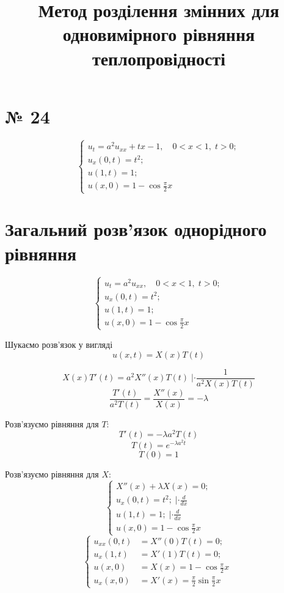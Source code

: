 \documentclass[11pt, a4paper]{article} %
\begin{document}

\title{Метод розділення змінних для одновимірного рівняння теплопровідності}
\date{}
\maketitle


\section*{№ 24}

\begin{mdframed}
    \begin{equation}
        \begin{cases}
            u_t=a^2 u_{xx} + tx -1, \quad 0<x<1,\; t>0;\\
            u_x(0,t) = t^2;\\
            u(1,t) = 1;\\
            u(x,0) = 1 - \cos \frac{\pi}{2}x
        \end{cases}    
    \end{equation}
\end{mdframed}

\section*{Загальний розв'язок однорідного рівняння}
\begin{mdframed}
    $$\begin{cases}
        u_t=a^2 u_{xx}, \quad 0<x<1,\; t>0;\\
        u_x(0,t) = t^2;\\
        u(1,t) = 1;\\
        u(x,0) = 1 - \cos \frac{\pi}{2}x
    \end{cases}$$
\end{mdframed}

Шукаємо розв'язок у вигляді
$$u(x,t) = X(x)T(t)$$

$$X(x)T'(t) = a^2 X''(x)T(t)\; | \cdot \frac{1}{a^2X(x)T(t)}$$
$$\frac{T'(t)}{a^2T(t)} = \frac{X''(x)}{X(x)} = -\lambda$$

Розв'язуємо рівняння для $T$:
$$T'(t)=-\lambda a^2 T(t)$$
$$T(t) = e^{-\lambda a^2 t}$$
$$T(0) = 1$$

Розв'язуємо рівняння для $X$:
$$\begin{cases}
    X''(x) + \lambda X(x) = 0;\\
    u_x(0,t) = t^2; \; | \cdot \frac{d}{dx}\\
    u(1,t) = 1;\; | \cdot \frac{d}{dx}\\
    u(x,0) = 1 - \cos \frac{\pi}{2}x\;
\end{cases}$$
$$\begin{cases}
    u_{xx}(0,t) &= X''(0)T(t) = 0;\\
    u_x(1,t) &= X'(1)T(t) = 0;\\
    u(x,0) &= X(x) = 1 - \cos \frac{\pi}{2}x\;\\
    u_x(x,0) &= X'(x) = \frac{\pi}{2} \sin \frac{\pi}{2}x
\end{cases}$$
\end{document}
